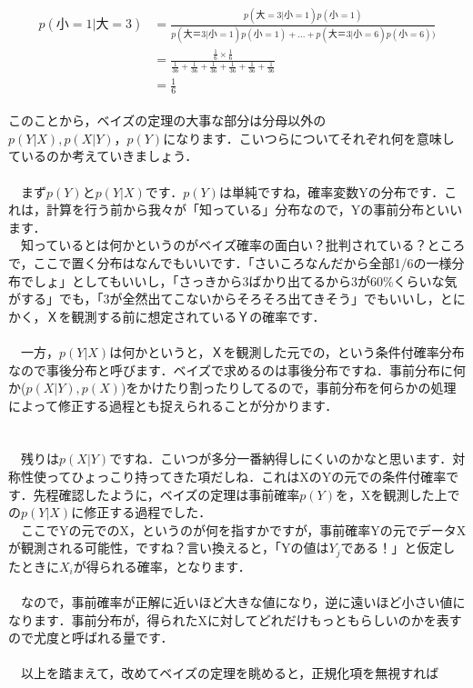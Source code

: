 \documentclass[11pt,a4paper]{jsarticle}                    %
\begin{document}
\begin{eqnarray}
\begin{split}
p(小=1|大=3) &= \frac{p(大=3|小=1)p(小=1)}{p(大＝3|小=1)p(小=1) + ... + p(大＝3|小=6)p(小=6))}\\
&= \frac{\frac{1}{6} \times \frac{1}{6}}{\frac{1}{36} + \frac{1}{36} + \frac{1}{36} + \frac{1}{36} + \frac{1}{36}+ \frac{1}{36}}\\
&= \frac{1}{6}
\end{split}
\end{eqnarray}

このことから，ベイズの定理の大事な部分は分母以外の$p(Y|X), p(X|Y)，p(Y)$になります．こいつらについてそれぞれ何を意味しているのか考えていきましょう．\\
\\
　まず$p(Y)$と$p(Y|X)$です．$p(Y)$は単純ですね，確率変数Yの分布です．これは，計算を行う前から我々が「知っている」分布なので，Yの事前分布といいます．\\
　知っているとは何かというのがベイズ確率の面白い？批判されている？ところで，ここで置く分布はなんでもいいです．「さいころなんだから全部1/6の一様分布でしょ」としてもいいし，「さっきから3ばかり出てるから3が60\%くらいな気がする」でも，「3が全然出てこないからそろそろ出てきそう」でもいいし，とにかく，Ｘを観測する前に想定されているＹの確率です．\\
\\
　一方，$p(Y|X)$は何かというと，Ｘを観測した元での，という条件付確率分布なので事後分布と呼びます．ベイズで求めるのは事後分布ですね．事前分布に何か($p(X|Y), p(X)$)をかけたり割ったりしてるので，事前分布を何らかの処理によって修正する過程とも捉えられることが分かります．\\
\\
\\
　残りは$p(X|Y)$ですね．こいつが多分一番納得しにくいのかなと思います．対称性使ってひょっこり持ってきた項だしね．これはXのYの元での条件付確率です．先程確認したように，ベイズの定理は事前確率$p(Y)$を，Xを観測した上での$p(Y|X)$に修正する過程でした．\\
　ここでYの元でのX，というのが何を指すかですが，事前確率Yの元でデータXが観測される可能性，ですね？言い換えると，「Yの値は$Y_j$である！」と仮定したときに$X_i$が得られる確率，となります．\\
\\
　なので，事前確率が正解に近いほど大きな値になり，逆に遠いほど小さい値になります．事前分布が，得られたXに対してどれだけもっともらしいのかを表すので尤度と呼ばれる量です．\\
\\
　以上を踏まえて，改めてベイズの定理を眺めると，正規化項を無視すれば
\end{document}
